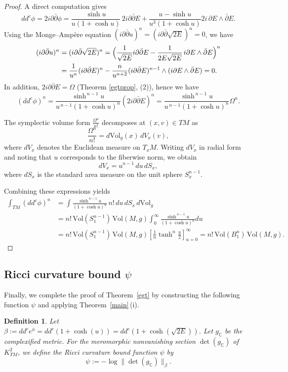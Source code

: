 \documentclass[a4paper, 12pt]{article}
\newcommand{\idd}{i\partial\bar\partial}
\newcommand{\gC}{g_{\mathbb{C}}}
\newtheorem{defn}[thm]{Definition}
\begin{document}
\begin{proof}
A direct computation gives
\[
dd^c\phi=2\idd\phi=\frac{\sinh u}{u(1+\cosh u)}\,2\idd E+
\frac{u-\sinh u}{u^3(1+\cosh u)}
2i\,\partial E\wedge\bar\partial E .
\]
Using the Monge--Amp\`ere equation $(\idd u)^n=(\idd\sqrt{2E})^n=0$, we have
\begin{align}
(\idd u)^n 
&= (\idd \sqrt{2E})^n = \Bigl(\frac{1}{\sqrt{2E}}\idd E - \frac{1}{2E\sqrt{2E}}\, i\partial E \wedge \bar\partial E\Bigr)^n\notag \\
&= \frac{1}{u^n}(\idd E)^n - \frac{n}{u^{n+2}}(\idd E)^{n-1}\wedge (i\partial E \wedge \bar\partial E) = 0. \label{MA}
\end{align}
In addition, $2\idd E=\Omega$ (Theorem \ref{egtprop}, (2)), hence we have
\[
(dd^c\phi)^n=\frac{\sinh^{\,n-1}u}{u^{\,n-1}(1+\cosh u)^n}(2\idd E)^n=\frac{\sinh^{\,n-1}u}{u^{\,n-1}(1+\cosh u)^n} \Omega^n .
\]

The symplectic volume form $\frac{\Omega^n}{n!}$ decomposes at $(x,v)\in TM$ as
\[
\frac{\Omega^n}{n!}=d\mathrm{Vol}_g(x)\,dV_x(v),
\]
where $dV_x$ denotes the Euclidean measure on $T_xM$. Writing $dV_x$ in radial form and noting that $u$ corresponds to the fiberwise norm, we obtain
\[
dV_x=u^{n-1}\,du\,dS_x,
\]
where $dS_x$ is the standard area measure on the unit sphere $S_x^{n-1}$.

Combining these expressions yields
\begin{align*}
\int_{TM}(dd^c\phi)^n
&=\int \frac{\sinh^{\,n-1}u}{(1+\cosh u)^n}\,n!\,du\,dS_x\,d\mathrm{Vol}_g\\
&=n!\,\mathrm{Vol}(S^{n-1}_1)\,\mathrm{Vol}(M,g)\int_0^\infty \frac{\sinh^{\,n-1}u}{(1+\cosh u)^n}du\\
&=n!\,\mathrm{Vol}(S^{n-1}_1)\,\mathrm{Vol}(M,g)\left [\frac{1}{n}\tanh^n\frac{u}{2} \right ]_{u=0}^\infty=n!\,\mathrm{Vol}(B_1^n)\,\mathrm{Vol}(M,g).
\end{align*}
\end{proof}

\subsection{Ricci curvature bound $\psi$}

Finally, we complete the proof of Theorem~\ref{egt} by constructing the following function $\psi$ and applying Theorem~\ref{main}\,(i).

\begin{defn}
Let $\beta := dd^c e^\phi = dd^c(1+\cosh(u)) = dd^c(1+\cosh(\sqrt{2E}))$. Let $\gC$ be the complexified metric. For the meromorphic nonvanishing section $\det(\gC)$ of $K_{TM}^{2}$, we define the Ricci curvature bound function $\psi$ by
\[
\psi := -\log \| \det(\gC) \|_\beta.
\]
\end{defn}
\end{document}
